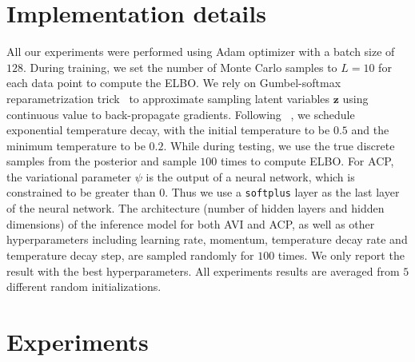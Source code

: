 \documentclass[twoside]{article}
\newcommand{\bz}{\mathbf{z}}
\newcommand{\btheta}{\bm{\theta}}
\newcommand{\bphi}{\bm{\phi}}
\newcommand{\bmu}{\bm{\mu}}
\newcommand{\bpsi}{\bm{\psi}}
\begin{document}

\section{Implementation details}

All our experiments were performed using Adam optimizer \cite{kingma2014adam} with a batch size of $128$. During training, we set the number of Monte Carlo samples to $L=10$ for each data point to compute the ELBO. We rely on Gumbel-softmax reparametrization trick~\cite{jang2016categorical} to approximate sampling latent variables $\bz$ using continuous value to back-propagate gradients. 
Following ~\cite{jang2016categorical}, we schedule exponential temperature decay, with the initial temperature to be $0.5$ and the minimum temperature to be $0.2$. While during testing, we use the true discrete samples from the posterior and sample $100$ times to compute ELBO. For ACP, the variational parameter $\psi$ is the output of a neural network, which is constrained to be greater than $0$. Thus we use a \texttt{softplus} layer as the last layer of the neural network.
The architecture (number of hidden layers and hidden dimensions) of the inference model for both AVI and ACP, as well as other hyperparameters including learning rate, momentum, temperature decay rate and temperature decay step, are sampled randomly for $100$ times. We only report the result with the best hyperparameters. All experiments results are averaged from $5$ different random initializations. 

\section{Experiments}
\end{document}
